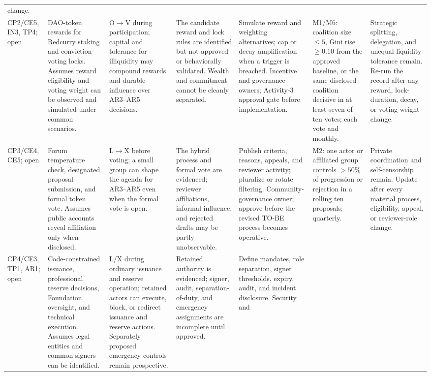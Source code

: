\documentclass[10pt]{article}
\begin{document}
\begin{landscape}
\begin{table}[H]
\begin{tabularx}{\linewidth}{@{}p{.065\linewidth}p{.125\linewidth}p{.165\linewidth}p{.135\linewidth}p{.16\linewidth}p{.15\linewidth}Y@{}}
change. \\
CP2/CE5, IN3, TP4; open & DAO-token rewards for Redcurry
staking and conviction-voting locks. Assumes reward eligibility and voting
weight can be observed and simulated under common scenarios. &
O$\rightarrow$V during participation; capital and tolerance for illiquidity
may compound rewards and durable influence over AR3--AR5 decisions. & The
candidate reward and lock rules are identified but not approved or behaviorally
validated. Wealth and commitment cannot be cleanly separated. & Simulate reward
and weighting alternatives; cap or decay amplification when a trigger is
breached. Incentive and governance owners; Activity-3 approval gate before
implementation. & M1/M6: coalition size $\leq5$, Gini rise $\geq0.10$ from the
approved baseline, or the same disclosed coalition decisive in at least seven
of ten votes; each
vote and monthly. & Strategic splitting, delegation, and unequal liquidity
tolerance remain. Re-run the record after any reward, lock-duration, decay, or
voting-weight change. \\
CP3/CE4, CE5; open & Forum temperature check, designated
proposal submission, and formal token vote. Assumes public accounts reveal
affiliation only when disclosed. & L$\rightarrow$X before voting; a small group
can shape the agenda for AR3--AR5 even when the formal vote is open. & The hybrid
process and formal vote are evidenced; reviewer affiliations, informal influence, and rejected
drafts may be partly unobservable. & Publish criteria, reasons, appeals, and
reviewer activity; pluralize or rotate filtering. Community-governance owner;
approve before the revised TO-BE process becomes operative. & M2: one actor or
affiliated group controls $>50\%$ of progression or rejection in a rolling ten
proposals; quarterly. & Private coordination and self-censorship remain. Update
after every material process, eligibility, appeal, or reviewer-role change. \\
CP4/CE3, TP1, AR1; open & Code-constrained issuance,
professional reserve decisions, Foundation oversight, and technical execution.
Assumes legal entities and common signers can be identified. & L/X during
ordinary issuance and reserve operation; retained actors can execute, block,
or redirect issuance and reserve actions. Separately proposed emergency
controls remain prospective. & Retained
authority is evidenced; signer, audit, separation-of-duty, and emergency
assignments are incomplete until approved. & Define mandates, role separation,
signer thresholds, expiry, audit, and incident disclosure. Security and

\end{tabularx}
\end{table}
\end{landscape}
\end{document}
